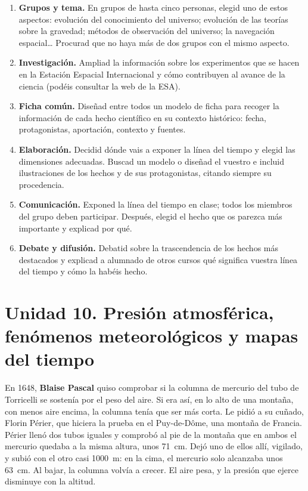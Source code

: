 \begin{enumerate}[label=\numberballred]
    \item \textbf{Grupos y tema.} En grupos de hasta cinco personas, elegid uno de estos aspectos: evolución del conocimiento del universo; evolución de las teorías sobre la gravedad; métodos de observación del universo; la navegación espacial\ldots{} Procurad que no haya más de dos grupos con el mismo aspecto.
    \item \textbf{Investigación.} Ampliad la información sobre los experimentos que se hacen en la Estación Espacial Internacional y cómo contribuyen al avance de la ciencia (podéis consultar la web de la ESA).
    \item \textbf{Ficha común.} Diseñad entre todos un modelo de ficha para recoger la información de cada hecho científico en su contexto histórico: fecha, protagonistas, aportación, contexto y fuentes.
    \item \textbf{Elaboración.} Decidid dónde vais a exponer la línea del tiempo y elegid las dimensiones adecuadas. Buscad un modelo o diseñad el vuestro e incluid ilustraciones de los hechos y de sus protagonistas, citando siempre su procedencia.
    \item \textbf{Comunicación.} Exponed la línea del tiempo en clase; todos los miembros del grupo deben participar. Después, elegid el hecho que os parezca más importante y explicad por qué.
    \item \textbf{Debate y difusión.} Debatid sobre la trascendencia de los hechos más destacados y explicad a alumnado de otros cursos qué significa vuestra línea del tiempo y cómo la habéis hecho.
\end{enumerate}

\section[Unidad 10. Presión atmosférica y mapas del tiempo]{Unidad 10. Presión atmosférica, fenómenos meteorológicos y mapas del tiempo}

En 1648, \textbf{Blaise Pascal} quiso comprobar si la columna de mercurio del tubo de Torricelli se sostenía por el peso del aire. Si era así, en lo alto de una montaña, con menos aire encima, la columna tenía que ser más corta. Le pidió a su cuñado, Florin Périer, que hiciera la prueba en el Puy-de-Dôme, una montaña de Francia. Périer llenó dos tubos iguales y comprobó al pie de la montaña que en ambos el mercurio quedaba a la misma altura, unos \qty{71}{\cm}. Dejó uno de ellos allí, vigilado, y subió con el otro casi \qty{1000}{\m}: en la cima, el mercurio solo alcanzaba unos \qty{63}{\cm}. Al bajar, la columna volvía a crecer. El aire pesa, y la presión que ejerce disminuye con la altitud.

